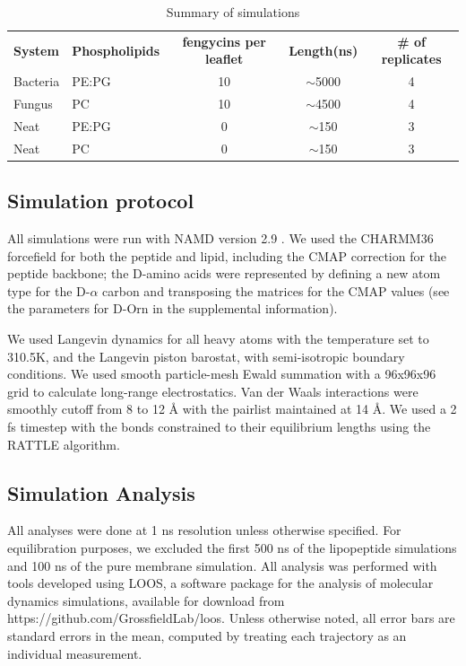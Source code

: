 \begin{table}
  \caption{Summary of simulations}
  \label{tbl:ch2_sys_cons}
  \begin{tabular}{llccc}
    \hline
    \textbf{System}  & \textbf{Phospholipids} & \textbf{fengycins per leaflet} & \textbf{Length(ns)} & \textbf{\# of replicates} \\
    Bacteria   & PE:PG & 10 & $\sim$5000  & 4 \\
    Fungus & PC  & 10 & $\sim$4500 & 4\\
    Neat  & PE:PG & 0 & $\sim$150 & 3\\
    Neat & PC & 0 & $\sim$150 &3\\
    \hline
  \end{tabular}
\end{table}

\subsection{Simulation protocol}
\label{ss:ch2_sim_proto}

All simulations were run with NAMD version 2.9 \cite{Schulten2005}. We used the
CHARMM36 forcefield for both the peptide and lipid, including the CMAP
correction for the peptide backbone; the D-amino acids were
represented by defining a new atom type for the D-$\alpha$ carbon and
transposing the matrices for the CMAP values (see the parameters for D-Orn in
the supplemental information).\cite{Grossfield2013,MacKerell2013,Pastor2010}

We used Langevin dynamics for all heavy atoms with the temperature set to
310.5K, and the Langevin piston barostat, with semi-isotropic
boundary conditions.\cite{Stoll1978,Brooks1995,Klein1994} We used smooth particle-mesh Ewald summation with a
96x96x96 grid to calculate long-range electrostatics.\cite{Ewald1921} Van der Waals interactions
were smoothly cutoff from 8 to 12 {\AA} with the pairlist maintained at 14 {\AA}.
We used a 2 fs timestep with the bonds constrained to their equilibrium lengths
using the RATTLE algorithm.\cite{Andersen1983}

\subsection{Simulation Analysis}
\label{ss:ch2_sim_ana}

All analyses were done at 1 ns resolution unless otherwise specified.  For
equilibration purposes, we excluded the first 500 ns of the lipopeptide
simulations and 100 ns of the pure membrane simulation. All
analysis was performed with tools developed using LOOS, a software package for the analysis of molecular dynamics simulations,
 available for download from https://github.com/GrossfieldLab/loos.\cite{Grossfield2014,Grossfield2009}
Unless otherwise noted, all error bars are standard errors in the mean, computed by treating each trajectory as an individual measurement.

